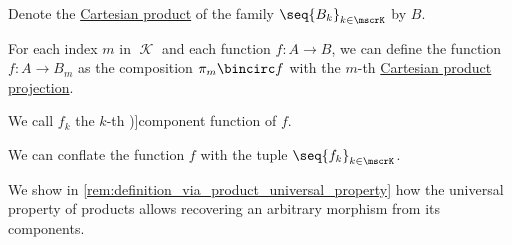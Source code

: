 \begin{definition}\label{def:function_component}
  Denote the \hyperref[def:cartesian_product]{Cartesian product} of the family \( \seq{ B_k }_{k \in \mscrK} \) by \( B \).

  For each index \( m \) in \( \mscrK \) and each function \( f: A \to B \), we can define the function \( {f: A \to B_m} \) as the composition \( \pi_m \bincirc f \) with the \( m \)-th \hyperref[def:cartesian_product_projection]{Cartesian product projection}.

  We call \( f_k \) the \( k \)-th \term[ru=компонента функции (\cite[596]{ИльинСадовничийСендов1985АнализТом1})]{component function} of \( f \).
\end{definition}
\begin{comments}
  \item We can conflate the function \( f \) with the tuple \( \seq{ f_k }_{k \in \mscrK} \).

  \item We show in \cref{rem:definition_via_product_universal_property} how the universal property of products allows recovering an arbitrary morphism from its components.
\end{comments}

